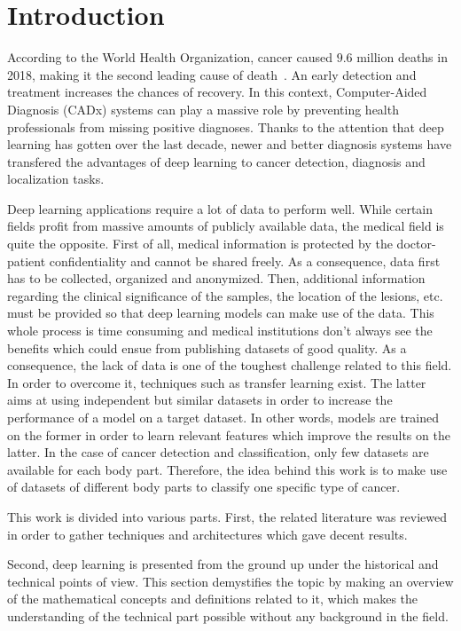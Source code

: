
\chapter{Introduction}
\label{ch:introduction}

According to the World Health Organization, cancer caused $9.6$ million deaths in 2018, making it the second leading cause of death~\cite{44}. An early detection and treatment increases the chances of recovery. In this context, Computer-Aided Diagnosis (CADx) systems can play a massive role by preventing health professionals from missing positive diagnoses. Thanks to the attention that deep learning has gotten over the last decade, newer and better diagnosis systems have transfered the advantages of deep learning to cancer detection, diagnosis and localization tasks.

Deep learning applications require a lot of data to perform well. While certain fields profit from massive amounts of publicly available data, the medical field is quite the opposite. First of all, medical information is protected by the doctor-patient confidentiality and cannot be shared freely. As a consequence, data first has to be collected, organized and anonymized. Then, additional information regarding the clinical significance of the samples, the location of the lesions, etc. must be provided so that deep learning models can make use of the data. This whole process is time consuming and medical institutions don't always see the benefits which could ensue from publishing datasets of good quality. As a consequence, the lack of data is one of the toughest challenge related to this field. In order to overcome it, techniques such as transfer learning exist. The latter aims at using independent but similar datasets in order to increase the performance of a model on a target dataset. In other words, models are trained on the former in order to learn relevant features which improve the results on the latter. In the case of cancer detection and classification, only few datasets are available for each body part. Therefore, the idea behind this work is to make use of datasets of different body parts to classify one specific type of cancer.

This work is divided into various parts. First, the related literature was reviewed in order to gather techniques and architectures which gave decent results.

Second, deep learning is presented from the ground up under the historical and technical points of view. This section demystifies the topic by making an overview of the mathematical concepts and definitions related to it, which makes the understanding of the technical part possible without any background in the field.

